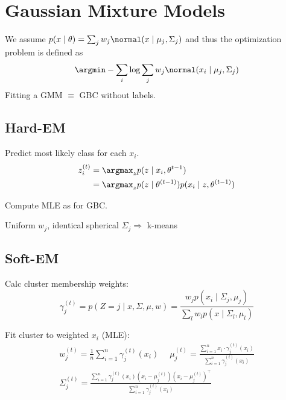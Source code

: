 \section{Gaussian Mixture Models}
We assume \(p(x \mid \theta) = \sum_j w_j \normal(x\mid \mu_j, \Sigma_j)\) and thus the optimization problem is defined as
\[\argmin - \sum_i \log \sum_j w_j \normal(x_i \mid \mu_j, \Sigma_j)\]
Fitting a GMM \(\equiv\) GBC without labels.

\subsection*{Hard-EM}
\begin{definition}[E-Step]
  Predict most likely class for each \(x_i\).
  \begin{align*}
    z_i^{(t)} &= \argmax_z p(z \mid x_i, \theta^{t-1}) \\
    &= \argmax_z p(z \mid \theta^{(t - 1)})p(x_i \mid z, \theta^{(t-1)})
  \end{align*}
\end{definition}

\begin{definition}[M-Step]
  Compute MLE as for GBC.
\end{definition}

Uniform \(w_j\), identical spherical \(\Sigma_j \Rightarrow\) k-means

\subsection{Soft-EM}
\begin{definition}[E-Step]
  Calc cluster membership weights:
  \[\gamma_j^{(t)} = p(Z = j \mid x, \Sigma, \mu, w) = \frac{w_j p(x_i \mid \Sigma_j, \mu_j)}{\sum_l w_l p(x \mid \Sigma_l, \mu_l)}\]
\end{definition}

\begin{definition}[M-Step]
  Fit cluster to weighted \(x_i\) (MLE):
  \begin{gather*}
    w_j^{(t)} = \frac{1}{n} \sum_{i=1}^n \gamma_j^{(t)}(x_i) \quad \; \mu_j^{(t)} = \frac{\sum_{i=1}^n x_i \cdot \gamma_j^{(t)}(x_i)}{\sum_{i=1}^n \gamma_j^{(t)}(x_i)} \\
    \Sigma_j^{(t)} = \frac{\sum_{i=1}^n \gamma_j^{(t)}(x_i)(x_i - \mu_j^{(t)})(x_i - \mu_j^{(t)})^\top}{\sum_{i=1}^n \gamma_j^{(t)}(x_i)}
  \end{gather*}
\end{definition}

